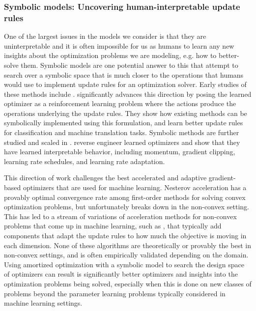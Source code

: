 \documentclass[twoside,11pt]{article}
\newcommand{\eg}{e.g.\xspace}
\begin{document}
\subsubsection{Symbolic models: Uncovering human-interpretable update rules}
One of the largest issues in the models we consider
is that they are uninterpretable and it is often impossible
for us as humans to learn any new insights about the optimization
problems we are modeling, \eg how to better-solve them.
Symbolic models are one potential answer to this that attempt
to search over a symbolic space that is much closer to the
operations that humans would use to implement update rules for
an optimization solver.
Early studies of these methods include
\citet{bengio1994use,runarsson2000evolution}.
\citet{bello2017neural} significantly advances this direction
by posing the learned optimizer as a reinforcement learning problem
where the actions produce the operations underlying the update rules.
They show how existing methods can be symbolically implemented
using this formulation, and learn better update rules for
classification and machine translation tasks.
Symbolic methods are further studied and scaled in
\citet{real2020automl,zheng2022symbolic}.
\citet{maheswaranathan2021reverse} reverse engineer learned
optimizers and show that they have learned interpretable behavior,
including momentum, gradient clipping, learning rate schedules,
and learning rate adaptation.

This direction of work challenges the best accelerated and adaptive
gradient-based optimizers that are used for machine learning.
Nesterov acceleration \citep{nesterov1983method} has a provably
optimal convergence rate among first-order methods for solving
convex optimization problems, but unfortunately breaks down
in the non-convex setting.
This has led to a stream of variations of acceleration methods
for non-convex problems that come up in machine learning,
such as \citet{duchi2011adaptive,zeiler2012adadelta,kingma2014adam},
that typically add components that adapt the update rules to
how much the objective is moving in each dimension.
None of these algorithms are theoretically or provably the
best in non-convex settings, and is often empirically validated
depending on the domain.
Using amortized optimization with a symbolic model to search
the design space of optimizers can result is significantly
better optimizers and insights into the optimization problems
being solved, especially when this is done on new classes
of problems beyond the parameter learning problems typically
considered in machine learning settings.
\end{document}
